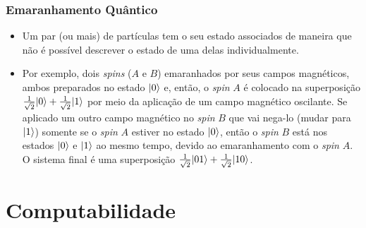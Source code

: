 \documentclass{beamer}
\DeclarePairedDelimiter\ket{\lvert}{\rangle}
\begin{document}
\begin{frame}
\frametitle{Emaranhamento Quântico}
\begin{itemize}
  \item Um par (ou mais) de partículas tem o seu estado associados de
  maneira que não é possível descrever o estado de uma delas
  individualmente.
  \item Por exemplo, dois \textit{spins} ($A$ e $B$) emaranhados por
seus campos magnéticos, ambos preparados no estado $\ket{0}$ e, então,
o \textit{spin} $A$ é colocado na superposição
$\frac{1}{\sqrt{2}} \ket{0} + \frac{1}{\sqrt{2}} \ket{1}$ por meio da
aplicação de um campo magnético oscilante. Se aplicado um outro campo
magnético no \textit{spin} $B$ que vai nega-lo (mudar para
$\ket{1}$) somente se o \textit{spin} $A$ estiver no estado $\ket{0}$,
então o \textit{spin} $B$ está nos estados $\ket{0}$ e $\ket{1}$ ao
mesmo tempo, devido ao emaranhamento com o \textit{spin} $A$. O sistema
final é uma superposição
$\frac{1}{\sqrt{2}} \ket{01} + \frac{1}{\sqrt{2}} \ket{10}$.
\end{itemize}
\end{frame}

\section{Computabilidade}
\end{document}
